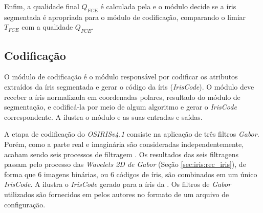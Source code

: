 \par Enfim, a qualidade final $Q_{FCE}$ é calculada pela  e o módulo decide se a íris segmentada é apropriada para o módulo de codificação, comparando o limiar $T_{FCE}$ com a qualidade $Q_{FCE}$.

\subsection{Codificação}\label{sec:metodologia:codificacao}

\par O módulo de codificação é o módulo responsável por codificar os atributos extraídos da íris segmentada e gerar o código da íris (\textit{IrisCode}). O módulo deve receber a íris normalizada em coordenadas polares, resultado do módulo de segmentação, e codificá-la por meio de algum algoritmo e gerar o \textit{IrisCode} correspondente. A  ilustra o módulo e as suas entradas e saídas.


\par A etapa de codificação do \textit{OSIRISv4.1} consiste na aplicação de três filtros \textit{Gabor}. Porém, como a parte real e imaginária são consideradas independentemente, acabam sendo seis processos de filtragem \cite{osirisv41_doc}. Os resultados das seis filtragens passam pelo processo das \textit{Wavelets 2D de Gabor} (Seção \ref{sec:iris:rec_iris}), de forma que 6 imagens binárias, ou 6 códigos de íris, são combinados em um único \textit{IrisCode}. A  ilustra o \textit{IrisCode} gerado para a íris da . Os filtros de \textit{Gabor} utilizados são fornecidos em \cite{osirisv41} pelos autores no formato de um arquivo de configuração.


